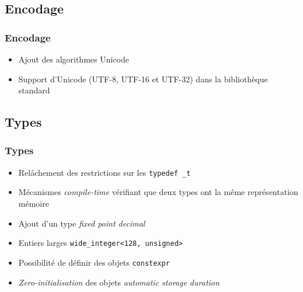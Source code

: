 \documentclass[C++.tex]{subfiles}
\begin{document}
\subsection*{Encodage}
\begin{frame}[fragile]
	\frametitle{Encodage}
	\begin{itemize}
		\item Ajout des algorithmes Unicode


		\item Support d'Unicode (UTF-8, UTF-16 et UTF-32) dans la bibliothèque standard
	\end{itemize}
\end{frame}

\subsection*{Types}
\begin{frame}[fragile]
	\frametitle{Types}
	\begin{itemize}
		\item Relâchement des restrictions sur les \lstinline|typedef _t|
		\item Mécanismes \textit{compile-time} vérifiant que deux types ont la même représentation mémoire


		\item Ajout d'un type \og{}\textit{fixed point decimal}\fg{}
		\item Entiers larges \lstinline|wide_integer<128, unsigned>|
		\item Possibilité de définir des objets \lstinline|constexpr|
		\item \textit{Zero-initialisation} des objets \textit{automatic storage duration}

	\end{itemize}
\end{frame}
\end{document}
